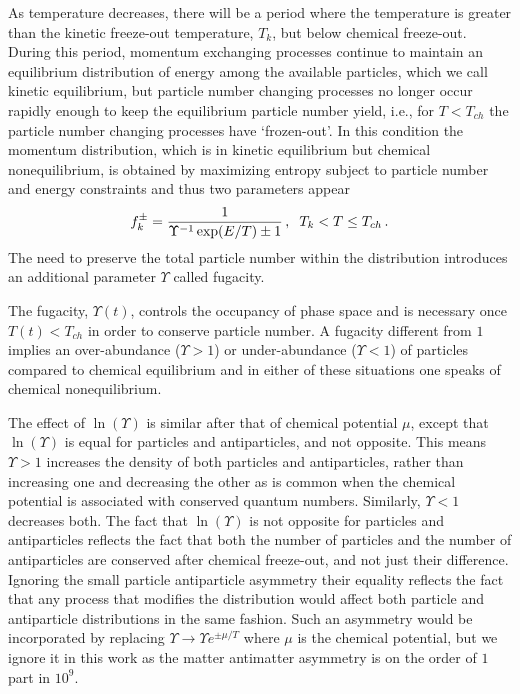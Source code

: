 As temperature decreases, there will be a period where the temperature is greater than the kinetic freeze-out temperature, $T_k$, but below chemical freeze-out. During this period, momentum exchanging processes continue to maintain an equilibrium distribution of energy among the available particles, which we call kinetic equilibrium, but particle number changing processes no longer occur rapidly enough to keep the equilibrium particle number yield, i.e., for $T<T_{ch}$ the particle number changing processes have `frozen-out'. In this condition the momentum distribution, which is in kinetic equilibrium but chemical nonequilibrium, is obtained by maximizing entropy subject to particle number and energy constraints and thus two parameters appear
\begin{equation}\label{eq:kEq}
f_{k}^\pm=\frac{1}{\Upsilon^{-1} \exp(E/T)\pm 1}\,,\hspace{2mm} T_k<T\leq T_{ch}\,.
\end{equation}
The need to preserve the total particle number within the distribution introduces an additional parameter $\Upsilon$ called fugacity. 

The fugacity, $\Upsilon(t)$, controls the occupancy of phase space and is necessary once $T(t)<T_{ch}$ in order to conserve particle number. A fugacity different from $1$ implies an over-abundance ($\Upsilon>1$) or under-abundance ($\Upsilon<1$) of particles compared to chemical equilibrium and in either of these situations one speaks of chemical nonequilibrium. 

The effect of $\ln(\Upsilon)$ is similar after that of chemical potential $\mu$, except that $\ln(\Upsilon)$ is equal for particles and antiparticles, and not opposite. This means $\Upsilon>1$ increases the density of both particles and antiparticles, rather than increasing one and decreasing the other as is common when the chemical potential is associated with conserved quantum numbers. Similarly,  $\Upsilon<1$ decreases both. The fact that $\ln(\Upsilon)$ is not opposite for particles and antiparticles reflects the fact that both the number of particles and the number of antiparticles are conserved after chemical freeze-out, and not just their difference. Ignoring the small particle antiparticle asymmetry their equality reflects the fact that any process that modifies the distribution would affect both particle and antiparticle distributions in the same fashion. Such an asymmetry would be incorporated by replacing $\Upsilon\rightarrow \Upsilon e^{\pm\mu/T}$ where $\mu$ is the chemical potential, but we ignore it in this work as the matter antimatter asymmetry is on the order of $1$ part in $10^9$.

